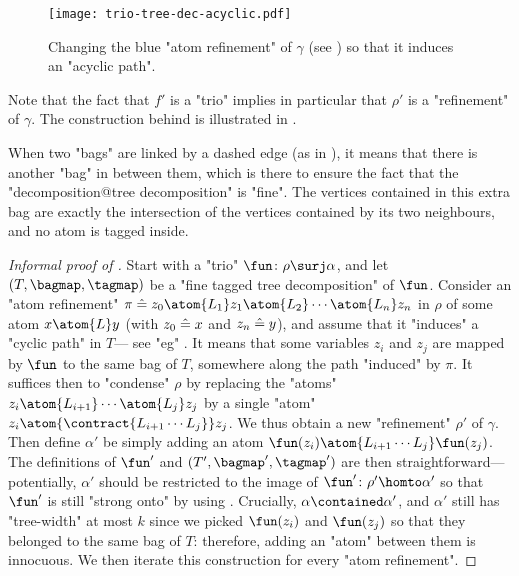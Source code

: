 \begin{figure}[tbp]
	\centering
	\texttt{[image: trio-tree-dec-acyclic.pdf]}
	\caption{
		\AP\label{fig:path-induced}
        Changing the blue "atom refinement" of $\gamma$ (see )
		so that it induces an "acyclic path".
	}
\end{figure}

Note that the fact that $f'$ is a "trio" implies in particular that
$\rho'$ is a "refinement" of $\gamma$.
The construction behind  is
illustrated in .
\begin{notation}
	\AP\label{nota:nice-tree-dec}
	When two "bags" are linked by a dashed
	edge (as in ), it means
	that there is another "bag" in between them, which is there
	to ensure the fact that the "decomposition@tree decomposition" is "fine".
	The vertices contained in this extra bag are exactly the intersection of
	the vertices contained by its two neighbours, and no atom is tagged inside.
\end{notation}

\begin{proof}[Informal proof of ]
    Start with a "trio"
    $\fun\colon \rho \surj \alpha$, and let $(T, \bagmap, \tagmap)$ be a "fine tagged tree decomposition" of
    $\fun$. Consider an "atom refinement"
    $\pi \defeq z_0 \atom{L_1} z_1 \atom{L_2} \cdots \atom{L_n} z_n$
    in $\rho$ of some atom $x \atom{L} y$ (with $z_0 \mathrel{\hat{=}} x$ and $z_n \mathrel{\hat{=}} y$),
    and assume that it "induces"
    a "cyclic path" in $T$--- see "eg" . It means that some variables $z_i$ and $z_j$ are mapped by $\fun$
    to the same bag of $T$, somewhere along the path "induced" by $\pi$. It suffices then to "condense" $\rho$
    by replacing the "atoms" $z_i \atom{L_{i+1}} \cdots \atom{L_j} z_j$ by a single
    "atom" $z_i \atom{\contract{L_{i+1} \cdots L_j}} z_j$.
    We thus obtain a new "refinement" $\rho'$ of $\gamma$.
    Then define $\alpha'$ be simply adding an atom $\fun(z_i) \atom{L_{i+1} \cdots L_j} \fun(z_j)$.
    The definitions of $\fun'$ and $(T',\bagmap',\tagmap')$ are then straightforward---potentially,
    $\alpha'$ should be restricted to the image of $\fun'\colon \rho' \homto \alpha'$ so that $\fun'$ is still "strong onto" by using . Crucially, $\alpha \contained \alpha'$, and $\alpha'$ still has "tree-width" at most $k$ 
    since we picked $\fun(z_i)$ and $\fun(z_j)$ so that they belonged to the same bag of $T$: therefore, adding an "atom" between them is innocuous.
	We then iterate this construction for every "atom refinement".
\end{proof}


